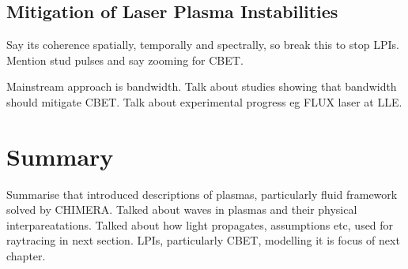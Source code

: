 \subsection{Mitigation of Laser Plasma Instabilities}%
\label{sec:theory_lpi_mitigation}

Say its coherence spatially, temporally and spectrally, so break this to stop LPIs.
Mention stud pulses and say zooming for CBET.

Mainstream approach is bandwidth.
Talk about studies showing that bandwidth should mitigate CBET.
Talk about experimental progress eg FLUX laser at LLE.


\section{Summary}%
\label{sec:theory_summary}

Summarise that introduced descriptions of plasmas, particularly fluid framework solved by CHIMERA.
Talked about waves in plasmas and their physical interpareatations.
Talked about how light propagates, assumptions etc, used for raytracing in next section.
LPIs, particularly CBET, modelling it is focus of next chapter.
